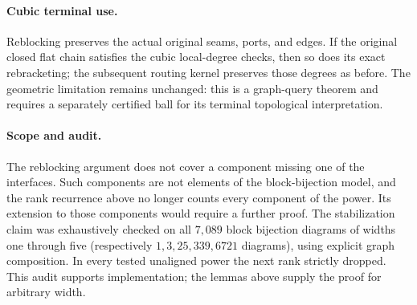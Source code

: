 \paragraph{Cubic terminal use.}
Reblocking preserves the actual original seams, ports, and edges.  If the
original closed flat chain satisfies the cubic local-degree checks, then so
does its exact rebracketing; the subsequent routing kernel preserves those
degrees as before.  The geometric limitation remains unchanged: this is a
graph-query theorem and requires a separately certified ball for its terminal
topological interpretation.

\paragraph{Scope and audit.}
The reblocking argument does not cover a component missing one of the
interfaces.  Such components are not elements of the block-bijection model,
and the rank recurrence above no longer counts every component of the power.
Its extension to those components would require a further proof.
The stabilization claim was exhaustively checked on all $7{,}089$ block
bijection diagrams of widths one through five (respectively $1,3,25,339,6721$
diagrams), using explicit graph composition.  In every tested unaligned
power the next rank strictly dropped.  This audit supports implementation;
the lemmas above supply the proof for arbitrary width.

